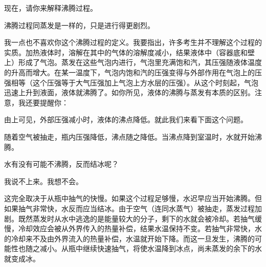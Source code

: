 \begin{dialogue}
现在，请你来解释沸腾过程。

\stda 沸腾过程同蒸发是一样的，只是进行得更剧烈。

\tchr 我一点也不喜欢你这个沸腾过程的定义。我要指出，许多考生并不理解这个过程的实质。加热液体时，溶解在其中的气体的溶解度减小，结果液体中（容器底和壁上）形成了气泡。蒸发在这些气泡内进行，气泡里充满饱和汽，其压强随液体温度的升高而增大。在某一温度下，气泡内饱和汽的压强变得与外部作用在气泡上的压强相等（这个压强等于大气压强加上气泡上方水层的压强）。从这个时刻起，气泡迅速上升到液面，液体就沸腾了。如你所见，液体的沸腾与蒸发有本质的区别。注意，我还要提醒你：

由上可见，外部压强减小时，液体的沸点降低。就此我们来看下面这个问题。

\stda 随着空气被抽走，瓶内压强降低，沸点随之降低。当沸点降到室温时，水就开始沸腾。

\tchr 水有没有可能不沸腾，反而结冰呢？

\stda 我说不上来。我想不会。

\tchr 这完全取决于从瓶中抽气的快慢。如果这个过程足够慢，水迟早应当开始沸腾。但如果抽气非常快，水反而应当结冰。由于空气（连同水蒸气）被抽走，蒸发过程加剧。既然蒸发时从水中逃逸的是能量较大的分子，剩下的水就会被冷却。若抽气缓慢，冷却效应会被从外界传入的热量补偿，结果水温保持不变。若抽气非常快，水的冷却来不及由外界流入的热量补偿，水温就开始下降。而这一旦发生，沸腾的可能性也随之减小。从瓶中继续快速抽气，将使水温降到冰点，尚未蒸发的余下的水就变成冰。

\end{dialogue}


\cleardoublepage

